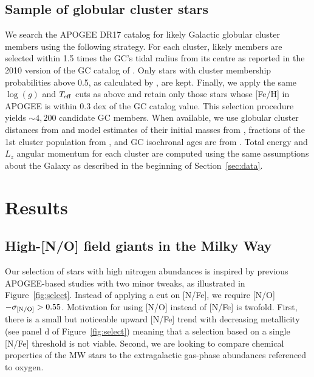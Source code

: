 \documentclass[a4paper,useAMS,usenatbib]{mnras}
\begin{document}
\subsection{Sample of globular cluster stars}

We search the APOGEE DR17 catalog for likely Galactic globular cluster members using the following strategy. For each cluster, likely members are selected within 1.5 times the GC's tidal radius from its centre as reported in the 2010 version of the GC catalog of \citet{Harris2010}. 
Only stars with cluster membership probabilities above 0.5,  as calculated by \citet{Vasiliev2021}, are kept. Finally, we apply the same $\log(g)$ and $T_{\rm eff}$ cuts as above and retain only those stars whose [Fe/H] in APOGEE is within 0.3 dex of the GC catalog value. This selection procedure yields $\sim4,200$ candidate GC members. When available, we use globular cluster distances  from \citet{Baumgardt2021} and model estimates of their initial masses from \citet{Baumgardt2003}, fractions of the 1st cluster population from \citet{Milone2017}, and GC isochronal ages are from \citet{VdB2013}. Total energy  and $L_z$ angular momentum for each cluster are computed using the same assumptions about the Galaxy as described in the beginning of Section~\ref{sec:data}.

\section{Results} 
\label{sec:res}

\subsection{High-[N/O] field giants in the Milky Way}
\label{sec:no_select}

Our selection of stars with high nitrogen abundances is inspired by previous APOGEE-based studies \citep[e.g.][]{Schiavon2017, Horta2021} with two minor tweaks, as illustrated in Figure~\ref{fig:select}. Instead of applying a cut on [N/Fe], we require {\rm [N/O]}$-\sigma_{\rm [N/O]}>0.55$. Motivation for using [N/O] instead of [N/Fe] is twofold. First, there is a small but noticeable upward [N/Fe] trend with decreasing metallicity (see panel d of Figure~\ref{fig:select}) meaning that a selection based on a single [N/Fe] threshold is not viable. Second, we are looking to compare chemical properties of the MW stars to the extragalactic gas-phase abundances referenced to oxygen. 
\end{document}
